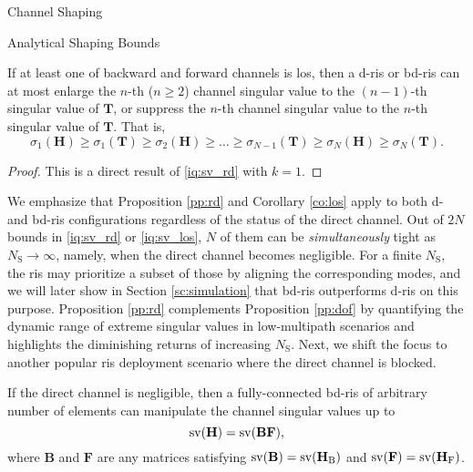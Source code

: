 \documentclass[journal]{IEEEtran}
\begin{document}
\begin{section}{Channel Shaping}
\begin{subsection}{Analytical Shaping Bounds}
		\begin{corollary}
			\label{co:los}
			If at least one of backward and forward channels is \gls{los}, then a \gls{d}-\gls{ris} or \gls{bd}-\gls{ris} can at most enlarge the $n$-th ($n \ge 2$) channel singular value to the $(n-1)$-th singular value of $\mathbf{T}$, or suppress the $n$-th channel singular value to the $n$-th singular value of $\mathbf{T}$.
			That is,
			\begin{equation}
				\label{iq:sv_los}
				\sigma_1(\mathbf{H}) \ge \sigma_1(\mathbf{T}) \ge {\sigma_2(\mathbf{H})} \ge \ldots \ge \sigma_{N-1}(\mathbf{T}) \ge {\sigma_N(\mathbf{H})} \ge \sigma_N(\mathbf{T}).
			\end{equation}
		\end{corollary}

		\begin{proof}
			This is a direct result of \eqref{iq:sv_rd} with $k = 1$.
		\end{proof}

		We emphasize that Proposition \ref{pp:rd} and Corollary \ref{co:los} apply to both \gls{d}- and \gls{bd}-\gls{ris} configurations regardless of the status of the direct channel.
		Out of $2N$ bounds in \eqref{iq:sv_rd} or \eqref{iq:sv_los}, $N$ of them can be \emph{simultaneously} tight as $N_\mathrm{S} \to \infty$, namely, when the direct channel becomes negligible.
		For a finite $N_\mathrm{S}$, the \gls{ris} may prioritize a subset of those by aligning the corresponding modes, and we will later show in Section \ref{sc:simulation} that \gls{bd}-\gls{ris} outperforms \gls{d}-\gls{ris} on this purpose.
		Proposition \ref{pp:rd} complements Proposition \ref{pp:dof} by quantifying the dynamic range of extreme singular values in low-multipath scenarios and highlights the diminishing returns of increasing $N_\mathrm{S}$.
		Next, we shift the focus to another popular \gls{ris} deployment scenario where the direct channel is blocked.


		\begin{proposition}
			\label{pp:nd}
			If the direct channel is negligible, then a fully-connected \gls{bd}-\gls{ris} of arbitrary number of elements can manipulate the channel singular values up to
			\begin{equation}
				\operatorname{sv}(\mathbf{H}) = \operatorname{sv}(\mathbf{BF}),
			\end{equation}
			where $\mathbf{B}$ and $\mathbf{F}$ are any matrices satisfying $\operatorname{sv}(\mathbf{B})=\operatorname{sv}(\mathbf{H}_\mathrm{B})$ and $\operatorname{sv}(\mathbf{F})=\operatorname{sv}(\mathbf{H}_\mathrm{F})$.
		\end{proposition}


\end{subsection}
\end{section}
\end{document}
